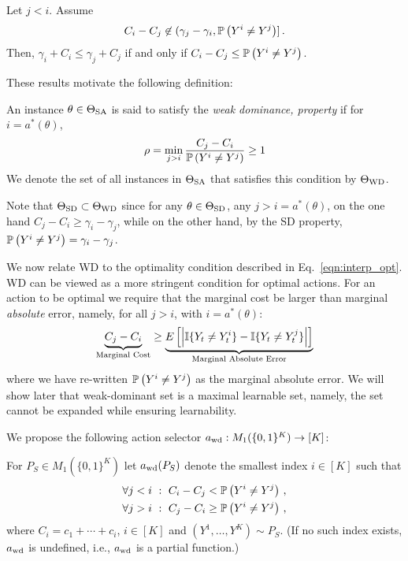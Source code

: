 \begin{prop}
\label{prop:jlei}
Let $j<i$. Assume
\begin{align}
\label{eq:cond2}
C_i - C_j \not\in (\gamma_j - \gamma_i, \mathbb{P}\left(Y^i \ne Y^j\right) ]\,.
\end{align}
Then, $\gamma_i + C_i \le \gamma_j + C_j$ if and only if $C_i - C_j \le \mathbb{P}\left(Y^i \ne Y^j\right)$.
\end{prop}

These results motivate the following definition:
\begin{defi}
	An instance $\theta \in \Theta_{\mathrm{SA}}$  is said to satisfy the \emph{weak dominance,  property} if 
	for $i = a^*(\theta)$,
	\begin{align}
	\label{eqn:WD} \rho = \min_{j > i} \frac{C_j - C_i}{\Prob{Y^i\ne Y^j}} \ge 1 %
	\end{align}
We denote the set of all instances in $\Theta_{\mathrm{SA}}$ that satisfies this condition by $\Theta_{\mathrm{WD}}$.	
\end{defi}
Note that $\Theta_{\mathrm{SD}}\subset \Theta_{\mathrm{WD}}$ since for any $\theta\in \Theta_{\mathrm{SD}}$, any $j>i = a^*(\theta)$, on the one hand $C_j - C_i \ge \gamma_i - \gamma_j$, while on the other hand, by the SD property, $\mathbb{P}\left(Y^i\ne Y^j\right) = \gamma_i - \gamma_j$.

We now relate WD to the optimality condition described in Eq.~\eqref{eqn:interp_opt}. WD can be viewed as a more stringent condition for optimal actions. For an action to be optimal we require that the marginal cost be larger than marginal \emph{absolute} error, namely, for all $j > i$, with $i = a^*(\theta)$:
\begin{equation} \label{eqn:interp_WD}
\underbrace{C_j - C_i}_{\text{Marginal Cost}} \geq \underbrace{ E \left [ \left | \mathbb{I}\{Y_t \ne Y_t^i\} - \mathbb{I}\{Y_t \ne Y_t^j\} \right | \right ]}_{\text{Marginal Absolute Error}}
\end{equation}
where we have re-written $\mathbb{P}\left(Y^i\ne Y^j\right)$ as the marginal absolute error. We will show later that weak-dominant set is a maximal learnable set, namely, the set cannot be expanded while ensuring learnability.


We propose the following action selector $a_{\mathrm{wd}}: M_1(\{0,1\}^K)  \to [K]$:
\begin{defi}\label{def:awd}
For $P_S \in M_1(\{0,1\}^K) $ let $a_{\mathrm{wd}}(P_S)$ denote the smallest index $i\in [K]$ such that
\begin{subequations}
\begin{align}
\forall j<i \,\,:\,\, C_i - C_j < \mathbb{P}\left( Y^i \ne Y^j \right)\,, \label{eq:wd1}\\ 
\forall j>i \,\,:\,\, C_j - C_i \ge \mathbb{P}\left( Y^i \ne Y^j \right)\,, \label{eq:wd2}
\end{align}
\end{subequations}
where $C_i = c_1+\cdots + c_i$, $i\in [K]$ and $(Y^1,\dots,Y^K) \sim P_S$.
(If no such index exists, $a_{\mathrm{wd}}$ is undefined, i.e., $a_{\mathrm{wd}}$ is a partial function.)
\end{defi}


